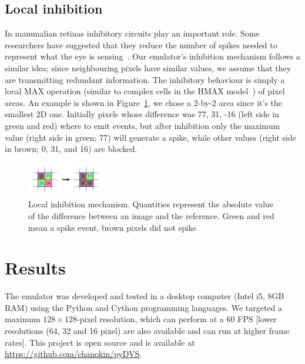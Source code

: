 \documentclass[conference]{IEEEtran}
\begin{document}
\subsection{Local inhibition}
\label{sec:local_inhibition}
In mammalian retinas inhibitory circuits play an important role. Some researchers have suggested that they reduce the number of spikes needed to represent what the eye is sensing~\cite{basab}. Our emulator's inhibition mechanism follows a similar idea; since neighbouring pixels have similar values, we assume that they are transmitting redundant information. The inhibitory behaviour is simply a local MAX operation (similar to complex cells in the HMAX model~\cite{riesenhuber1999hierarchical}) of pixel areas. An example is shown in Figure~\ref{fig:local_inh}, we chose a 2-by-2 area since it's the smallest 2D one. Initially pixels whose difference was 77, 31, -16 (left side in green and red) where to emit events, but after inhibition only the maximum value (right side in green; 77) will generate a spike, while other values (right side in brown; 0, 31, and 16) are blocked.

\begin{figure}[htb]
\centering
    \includegraphics[width=0.3\textwidth]{inh_local_max_img}
    \caption{Local inhibition mechanism. Quantities represent the absolute value of the difference between an image and the reference. Green and red mean a spike event, brown pixels did not spike}

  \label{fig:local_inh}
\end{figure}

\section{Results}
\label{sec:results}
The emulator was developed and tested in a desktop computer (Intel i5, 8GB RAM) using the Python and Cython programming languages. We targeted a maximum $128\times 128$-pixel resolution, which can perform at a 60 FPS [lower resolutions (64, 32 and 16 pixel) are also available and can run at higher frame rates]. This project is open source and is available at \url{https://github.com/chanokin/pyDVS}.
\end{document}

